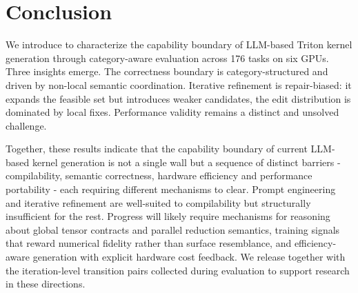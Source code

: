 \section{Conclusion}

We introduce \oursys to characterize the capability boundary of LLM-based Triton kernel generation through category-aware evaluation across 176 tasks on six GPUs. Three insights emerge.
The correctness boundary is category-structured and driven by non-local semantic coordination.
Iterative refinement is repair-biased: it expands the feasible set but introduces weaker candidates, the edit distribution is dominated by local fixes.
Performance validity remains a distinct and unsolved challenge.

Together, these results indicate that the capability boundary of current LLM-based kernel generation is not a single wall but a sequence of distinct barriers - compilability, semantic correctness, hardware efficiency and performance portability - each requiring different mechanisms to clear.
Prompt engineering and iterative refinement are well-suited to compilability but structurally insufficient for the rest.
Progress will likely require mechanisms for reasoning about global tensor contracts and parallel reduction semantics, training signals that reward numerical fidelity rather than surface resemblance, and efficiency-aware generation with explicit hardware cost feedback.
We release \oursys together with the iteration-level transition pairs collected during evaluation to support research in these directions.
